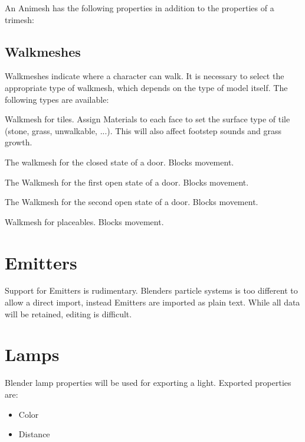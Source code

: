 An Animesh has the following properties in addition to the properties of a 
trimesh:

\subsection{Walkmeshes}
Walkmeshes indicate where a character can walk. It is necessary to select 
the appropriate type of walkmesh, which depends on the type of model itself. 
The following types are available:
\begin{description}[leftmargin=10em,style=nextline]
    \item[Tileset] Walkmesh for tiles. Assign Materials to each face to set the
                   surface type of tile (stone, grass, unwalkable, ...).
                   This will also affect footstep sounds and grass growth.
    \item[Door: Closed] The walkmesh for the closed state of a door. Blocks movement.
    \item[Door: Open 1] The Walkmesh for the first open state of a door. Blocks movement.
    \item[Door: Open 2] The Walkmesh for the second open state of a door. Blocks movement.
    \item[Placeable] Walkmesh for placeables. Blocks movement.
\end{description}

\section{Emitters}
Support for Emitters is rudimentary. Blenders particle systems is too
different to allow a direct import, instead Emitters are imported as plain
text. While all data will be retained, editing is difficult.

\section{Lamps}
Blender lamp properties will be used for exporting a light.
Exported properties are:
\begin{itemize}
\item Color
\item Distance
\end{itemize}

